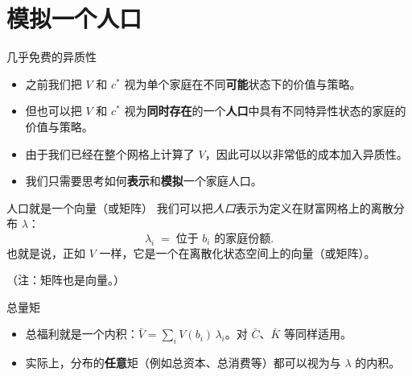 \documentclass[10pt,aspectratio=169]{beamer}
\begin{document}
\section{模拟一个人口}

\begin{frame}{几乎免费的异质性}
  \begin{itemize}
    \item 之前我们把 $V$ 和 $c^*$ 视为单个家庭在不同\textbf{可能}状态下的价值与策略。
    \item 但也可以把 $V$ 和 $c^*$ 视为\textbf{同时存在}的一个\textbf{人口}中具有不同特异性状态的家庭的价值与策略。
    \item 由于我们已经在整个网格上计算了 $V$，因此可以以非常低的成本加入异质性。
    \item 我们只需要思考如何\textbf{表示}和\textbf{模拟}一个家庭人口。
  \end{itemize}
\end{frame}

\begin{frame}{人口就是一个向量（或矩阵）}
  我们可以把\emph{人口}表示为定义在财富网格上的离散分布 $\lambda$：
  \[
    \lambda_i \;=\; \text{位于 } b_i \text{ 的家庭份额}.
  \]
  也就是说，正如 $V$ 一样，它是一个在离散化状态空间上的向量（或矩阵）。

  （注：矩阵也是向量。）
\end{frame}

\begin{frame}{总量矩}
  \begin{itemize}
    \item 总福利就是一个内积：$\bar{V} = \sum_i V(b_i) \, \lambda_i$。对 $\bar{C}$、$\bar{K}$ 等同样适用。
    \item 实际上，分布的\textbf{任意}矩（例如总资本、总消费等）都可以视为与 $\lambda$ 的内积。
  \end{itemize}
\end{frame}
\end{document}
